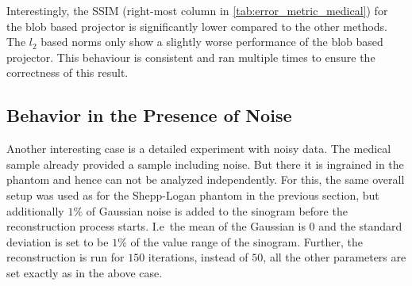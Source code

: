 Interestingly, the \gls{SSIM} (right-most column in \autoref{tab:error_metric_medical}) for the blob
based projector is significantly lower compared to the other methods. The \(l_2\) based norms only
show a slightly worse performance of the blob based projector. This behaviour is consistent and ran
multiple times to ensure the correctness of this result.

\subsection{Behavior in the Presence of Noise}

Another interesting case is a detailed experiment with noisy data. The medical sample already
provided a sample including noise. But there it is ingrained in the phantom and hence can not be
analyzed independently. For this, the same overall setup was used as for the Shepp-Logan phantom in
the previous section, but additionally \(1\%\) of Gaussian noise is added to the sinogram before the
reconstruction process starts. I.e\ the mean of the Gaussian is \(0\) and the standard deviation is
set to be \(1\%\) of the value range of the sinogram. Further, the reconstruction is run for \(150\)
iterations, instead of \(50\), all the other parameters are set exactly as in the above case.

